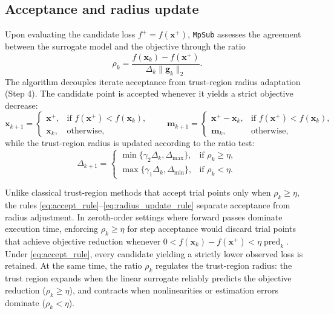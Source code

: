 \documentclass{siamart171218}
\newcommand{\bx}{\bm{x}}
\newcommand{\bg}{\bm{g}}
\begin{document}
\subsection{Acceptance and radius update}
\label{subsec:update}

Upon evaluating the candidate loss $f^+ = f(\bx^+)$, \texttt{MpSub} assesses the agreement between the surrogate model and the objective through the ratio
\begin{equation}
\rho_k = \frac{f(\bx_k) - f(\bx^+)}{\Delta_k \|\bg_k\|_2}.
\label{eq:agreement_ratio}
\end{equation}
The algorithm decouples iterate acceptance from trust-region radius adaptation (Step 4). The candidate point is accepted whenever it yields a strict objective decrease:
\begin{equation}
\bx_{k+1} =
\begin{cases}
\bx^+, & \text{if } f(\bx^+) < f(\bx_k), \\
\bx_k, & \text{otherwise},
\end{cases}
\qquad
\bm m_{k+1} =
\begin{cases}
\bx^+ - \bx_k, & \text{if } f(\bx^+) < f(\bx_k), \\
\bm m_k, & \text{otherwise},
\end{cases}
\label{eq:accept_rule}
\end{equation}
while the trust-region radius is updated according to the ratio test:
\begin{equation}
\Delta_{k+1} =
\begin{cases}
\min\{\gamma_2 \Delta_k, \Delta_{\max}\}, & \text{if } \rho_k \geq \eta, \\
\max\{\gamma_1 \Delta_k, \Delta_{\min}\}, & \text{if } \rho_k < \eta.
\end{cases}
\label{eq:radius_update_rule}
\end{equation}

Unlike classical trust-region methods \cite{conn2000trust} that accept trial points only when $\rho_k \ge \eta$, the rules \eqref{eq:accept_rule}--\eqref{eq:radius_update_rule} separate acceptance from radius adjustment. In zeroth-order settings where forward passes dominate execution time, enforcing $\rho_k \ge \eta$ for step acceptance would discard trial points that achieve objective reduction whenever $0 < f(\bx_k) - f(\bx^+) < \eta \operatorname{pred}_k$. Under \eqref{eq:accept_rule}, every candidate yielding a strictly lower observed loss is retained. At the same time, the ratio $\rho_k$ regulates the trust-region radius: the trust region expands when the linear surrogate reliably predicts the objective reduction ($\rho_k \ge \eta$), and contracts when nonlinearities or estimation errors dominate ($\rho_k < \eta$).
\end{document}
